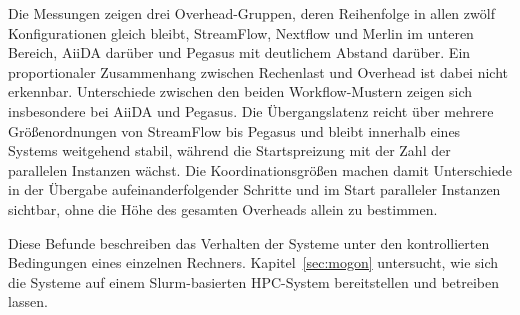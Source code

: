 Die Messungen zeigen drei Overhead-Gruppen, deren Reihenfolge in
allen zwölf Konfigurationen gleich bleibt, StreamFlow, Nextflow und
Merlin im unteren Bereich, AiiDA darüber und Pegasus mit deutlichem
Abstand darüber. Ein proportionaler Zusammenhang zwischen
Rechenlast und Overhead ist dabei nicht erkennbar. Unterschiede
zwischen den beiden Workflow-Mustern zeigen sich insbesondere bei
AiiDA und Pegasus. Die Übergangslatenz reicht über mehrere
Größenordnungen von StreamFlow bis Pegasus und bleibt innerhalb
eines Systems weitgehend stabil, während die Startspreizung mit der
Zahl der parallelen Instanzen wächst. Die Koordinationsgrößen
machen damit Unterschiede in der Übergabe aufeinanderfolgender
Schritte und im Start paralleler Instanzen sichtbar, ohne die Höhe
des gesamten Overheads allein zu bestimmen.

Diese Befunde beschreiben das Verhalten der Systeme unter den
kontrollierten Bedingungen eines einzelnen Rechners.
Kapitel~\ref{sec:mogon} untersucht, wie sich die Systeme auf einem
Slurm-basierten HPC-System bereitstellen und betreiben lassen.